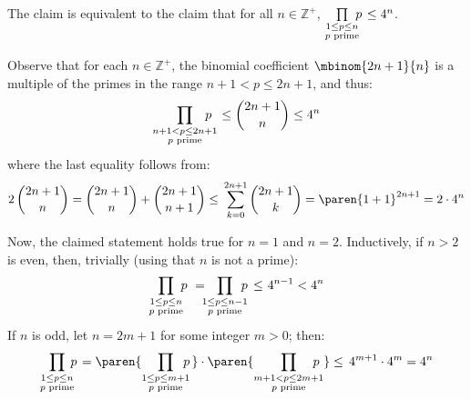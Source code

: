 The claim is equivalent to the claim that for all $n \in \mathbb{Z}^{+}$,
$\prod\limits_{\underset{\scriptstyle{p \text{ prime}}}{1 \leq p \leq n}} {\mspace{-8mu} p}  \mspace{2mu}
 \leq 4^{n}$.

Observe that for each $n \in \mathbb{Z}^{+}$,
the binomial coefficient $\mbinom{2 n + 1}{n}$ is a multiple of the primes in the range $n + 1 < p \leq 2 n + 1$,
and thus:
\begin{equation*}
  \prod\limits_{\underset{\scriptstyle{p \text{ prime}}}{n + 1 < p \leq 2 n + 1}} {\mspace{-20mu} p}  \mspace{9mu}
  \leq \binom{2 n + 1}{n}
  \leq 4^{n}
\end{equation*}
where the last equality follows from:
\begin{equation*}
  2 \, \binom{2 n + 1}{n}
  = \binom{2 n + 1}{n} + \binom{2 n + 1}{n + 1}
  \leq \, \sum\limits_{k = 0}^{2 n + 1} {\binom{2 n + 1}{k}}
  = \paren{1 + 1}^{2 n + 1}
  = 2 \cdot 4^{n}
\end{equation*}

Now, the claimed statement holds true for $n = 1$ and $n = 2$.
Inductively, if $n > 2$ is even, then, trivially (using that $n$ is not a prime):
\begin{equation*}
  \prod\limits_{\underset{\scriptstyle{p \text{ prime}}}{1 \leq p \leq n}} {\mspace{-6mu} p}  \mspace{6mu}
  = \mspace{-9mu} \prod\limits_{\underset{\scriptstyle{p \text{ prime}}}{1 \leq p \leq n - 1}} {\mspace{-12mu} p}  \mspace{3mu}
  \leq \mspace{1.2mu} 4^{n - 1}
  < 4^{n}
\end{equation*}
If $n$ is odd, let $n = 2 m + 1$ for some integer $m > 0$; then:
\begin{equation*}
  \prod\limits_{\underset{\scriptstyle{p \text{ prime}}}{1 \leq p \leq n}} {\mspace{-8mu} p}  \mspace{2mu}
  = \paren{\prod\limits_{\underset{\scriptstyle{p \text{ prime}}}{1 \leq p \leq m + 1}} {\mspace{-12mu} p} \mspace{3mu}}
    \cdot
    \paren{\prod\limits_{\underset{\scriptstyle{p \text{ prime}}}{m + 1 < p \leq 2 m + 1}} {\mspace{-18mu} p} \mspace{6mu}}
  \leq \, 4^{m + 1} \cdot 4^{m}
  = 4^{n}
\end{equation*}

